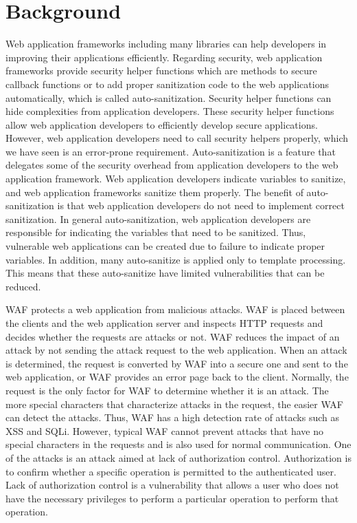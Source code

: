 \documentclass[conference]{IEEEtran}
\begin{document}
\section{Background}
Web application frameworks\cite{chaudhuri2010symbolic} including many libraries can help developers in improving their applications efficiently.
Regarding security, web application frameworks provide security helper functions which are methods to secure callback functions or to add proper sanitization code to the web applications automatically, which is called auto-sanitization\cite{weinberger2011systematic}.
Security helper functions can hide complexities from application developers.
These security helper functions allow web application developers to efficiently develop secure applications.
However, web application developers need to call security helpers properly, which we have seen is an error-prone requirement.
Auto-sanitization is a feature that delegates some of the security overhead from application developers to the web application framework.
Web application developers indicate variables to sanitize, and web application frameworks sanitize them properly.
The benefit of auto-sanitization is that web application developers do not need to implement correct sanitization.
In general auto-sanitization, web application developers are responsible for indicating the variables that need to be sanitized.
Thus, vulnerable web applications can be created due to failure to indicate proper variables.
In addition, many auto-sanitize is applied only to template processing.
This means that these auto-sanitize have limited vulnerabilities that can be reduced.

WAF protects a web application from malicious attacks.
WAF is placed between the clients and the web application server and inspects HTTP requests and decides whether the requests are attacks or not.
WAF reduces the impact of an attack by not sending the attack request to the web application.
When an attack is determined, the request is converted by WAF into a secure one and sent to the web application, or WAF provides an error page back to the client.
Normally, the request is the only factor for WAF to determine whether it is an attack.
The more special characters that characterize attacks in the request, the easier WAF can detect the attacks.
Thus, WAF has a high detection rate of attacks such as XSS and SQLi.
However, typical WAF cannot prevent attacks that have no special characters in the requests and is also used for normal communication.
One of the attacks is an attack aimed at lack of authorization control.
Authorization is to confirm whether a specific operation is permitted to the authenticated user.
Lack of authorization control is a vulnerability that allows a user who does not have the necessary privileges to perform a particular operation to perform that operation.
\end{document}
